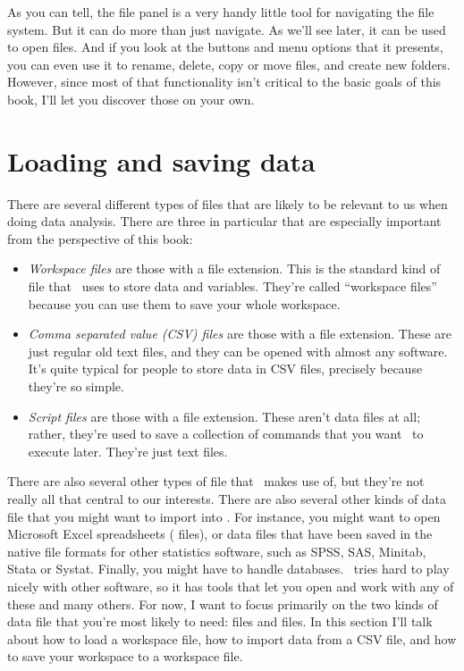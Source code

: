 As you can tell, the file panel is a very handy little tool for navigating the file system. But it can do more than just navigate. As we'll see later, it can be used to open files. And if you look at the buttons and menu options that it presents, you can even use it to rename, delete, copy or move files, and create new folders. However, since most of that functionality isn't critical to the basic goals of this book, I'll let you discover those on your own.

\section{Loading and saving data\label{sec:load}}

There are several different types of files that are likely to be relevant to us when doing data analysis. There are three in particular that are especially important from the perspective of this book:
\begin{itemize}
\item {\it Workspace files} are those with a  file extension. This is the standard kind of file that \R\ uses to store data and variables. They're called ``workspace files'' because you can use them to save your whole workspace. 
\item {\it Comma separated value (CSV) files} are those with a  file extension. These are just regular old text files, and they can be opened with almost any software. It's quite typical for people to store data in CSV files, precisely because they're so simple.
\item {\it Script files} are those with a  file extension. These aren't data files at all; rather, they're used to save a collection of commands that you want \R\ to execute later. They're just text files.
\end{itemize} 
There are also several other types of file that \R\ makes use of, but they're not really all that central to our interests. There are also several other kinds of data file that you might want to import into \R. For instance, you might want to open  Microsoft Excel spreadsheets ( files), or data files that have been saved in the native file formats for other statistics software, such as SPSS, SAS, Minitab, Stata or Systat.  Finally, you might have to handle databases. \R\ tries hard to play nicely with other software, so it has tools that let you open and work with any of these and many others. For now, I want to focus primarily on the two kinds of data file that you're most likely to need:  files and  files.
In this section I'll talk about how to load a workspace file, how to import data from a CSV file, and how to save your workspace to a workspace file. 




